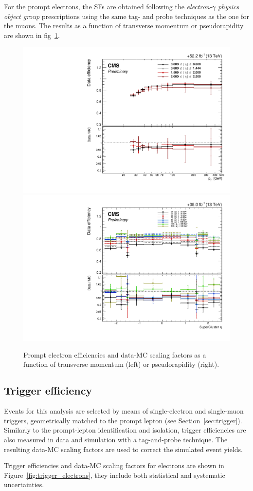 For the prompt electrons, the SFs are obtained following the \emph{electron-$\gamma$ physics object group}  prescriptions using the same
tag- and probe techniques as the one for the muons. The results as a function of transverse momentum or pseudorapidity are shown in fig~\ref{fig:id_sf_electrons}.
\begin{figure}[h]
  \centering
   \includegraphics[width=.38\textwidth]{Figures/c6/efficiencies/ID_electrons/2018/leptonSF_SFvspT_HNLprompt.pdf}
\hspace{1cm}
  \includegraphics[width=.38\textwidth]{Figures/c6/efficiencies/ID_electrons/2016/leptonSF_SFvseta_HNLprompt.pdf}
  \caption{Prompt electron efficiencies and data-MC scaling factors as
    a function of transverse momentum (left) or pseudorapidity
    (right). \tom}
  \label{fig:id_sf_electrons}
\end{figure}

\subsection{Trigger efficiency} \label{sec:triggereff}
Events for this analysis are selected by means of single-electron and
single-muon triggers, geometrically matched to the prompt lepton \lone
(see Section~\ref{sec:trigger}).
Similarly to the prompt-lepton identification and isolation,
trigger efficiencies are also measured in data and simulation with a
tag-and-probe technique. The resulting data-MC scaling factors are used to correct the
simulated event yields. 

Trigger efficiencies and data-MC scaling
factors for electrons are shown in Figure~\ref{fig:trigger_electrons},
they include both statistical and systematic uncertainties.

